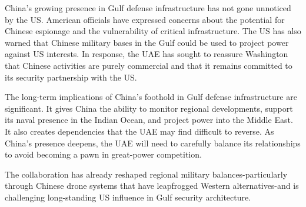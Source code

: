 \documentclass[10pt,a4paper]{article}
\begin{document}
{\small China's growing presence in Gulf defense infrastructure has not gone unnoticed by the US. American officials have expressed concerns about the potential for Chinese espionage and the vulnerability of critical infrastructure. The US has also warned that Chinese military bases in the Gulf could be used to project power against US interests. In response, the UAE has sought to reassure Washington that Chinese activities are purely commercial and that it remains committed to its security partnership with the US.}\par
{\small The long-term implications of China's foothold in Gulf defense infrastructure are significant. It gives China the ability to monitor regional developments, support its naval presence in the Indian Ocean, and project power into the Middle East. It also creates dependencies that the UAE may find difficult to reverse. As China's presence deepens, the UAE will need to carefully balance its relationships to avoid becoming a pawn in great-power competition.}\par
{\small The collaboration has already reshaped regional military balances-particularly through Chinese drone systems that have leapfrogged Western alternatives-and is challenging long-standing US influence in Gulf security architecture.}\par
\label{chap:5:end}
\end{document}
